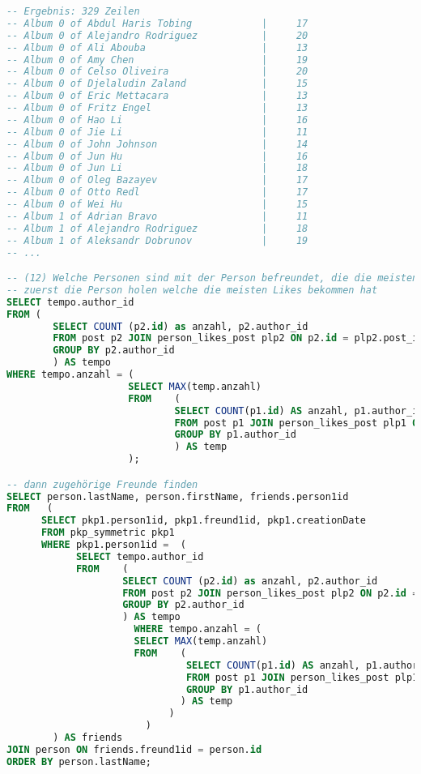 \begin{lstlisting}[language=sql]
-- Ergebnis: 329 Zeilen
-- Album 0 of Abdul Haris Tobing            |     17
-- Album 0 of Alejandro Rodriguez           |     20
-- Album 0 of Ali Abouba                    |     13
-- Album 0 of Amy Chen                      |     19
-- Album 0 of Celso Oliveira                |     20
-- Album 0 of Djelaludin Zaland             |     15
-- Album 0 of Eric Mettacara                |     13
-- Album 0 of Fritz Engel                   |     13
-- Album 0 of Hao Li                        |     16
-- Album 0 of Jie Li                        |     11
-- Album 0 of John Johnson                  |     14
-- Album 0 of Jun Hu                        |     16
-- Album 0 of Jun Li                        |     18
-- Album 0 of Oleg Bazayev                  |     17
-- Album 0 of Otto Redl                     |     17
-- Album 0 of Wei Hu                        |     15
-- Album 1 of Adrian Bravo                  |     11
-- Album 1 of Alejandro Rodriguez           |     18
-- Album 1 of Aleksandr Dobrunov            |     19
-- ...

-- (12) Welche Personen sind mit der Person befreundet, die die meisten Likes auf einen Post bekommen hat? Sortieren Sie die Ausgabe alphabetisch nach dem Nachnamen.
-- zuerst die Person holen welche die meisten Likes bekommen hat
SELECT tempo.author_id
FROM (
        SELECT COUNT (p2.id) as anzahl, p2.author_id
        FROM post p2 JOIN person_likes_post plp2 ON p2.id = plp2.post_id
        GROUP BY p2.author_id
        ) AS tempo
WHERE tempo.anzahl = (
                     SELECT MAX(temp.anzahl)
                     FROM    (
                             SELECT COUNT(p1.id) AS anzahl, p1.author_id
                             FROM post p1 JOIN person_likes_post plp1 ON p1.id = plp1.post_id
                             GROUP BY p1.author_id
                             ) AS temp
                     );

-- dann zugehörige Freunde finden
SELECT person.lastName, person.firstName, friends.person1id
FROM   (
      SELECT pkp1.person1id, pkp1.freund1id, pkp1.creationDate
      FROM pkp_symmetric pkp1
      WHERE pkp1.person1id =  (
            SELECT tempo.author_id
            FROM    (
                    SELECT COUNT (p2.id) as anzahl, p2.author_id
                    FROM post p2 JOIN person_likes_post plp2 ON p2.id = plp2.post_id
                    GROUP BY p2.author_id
                    ) AS tempo
                      WHERE tempo.anzahl = (
                      SELECT MAX(temp.anzahl)
                      FROM    (
                               SELECT COUNT(p1.id) AS anzahl, p1.author_id
                               FROM post p1 JOIN person_likes_post plp1 ON p1.id = plp1.post_id
                               GROUP BY p1.author_id
                              ) AS temp
                            )
                        )
        ) AS friends
JOIN person ON friends.freund1id = person.id
ORDER BY person.lastName;






\end{lstlisting}
